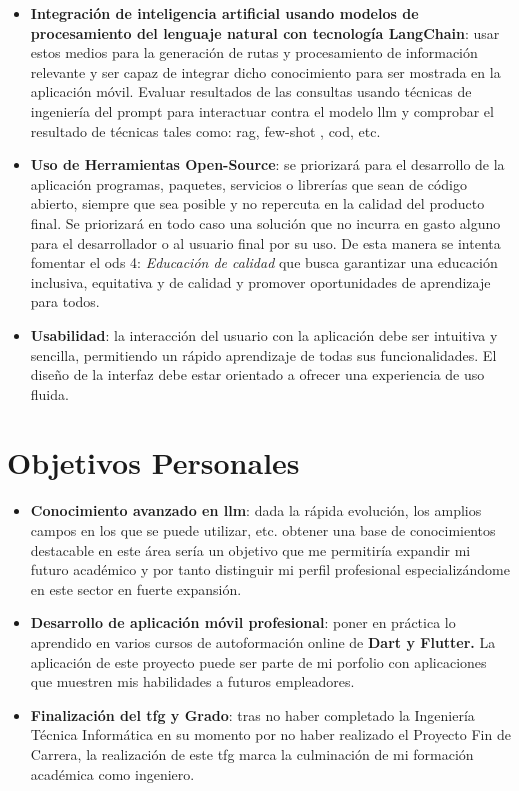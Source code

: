 \begin{itemize}
    \item \textbf{Integración de inteligencia artificial usando modelos de procesamiento del lenguaje natural con tecnología LangChain}: usar estos medios para la generación de rutas y procesamiento de información relevante y ser capaz de integrar dicho conocimiento para ser mostrada en la aplicación móvil. Evaluar resultados de las consultas usando técnicas de ingeniería del prompt para interactuar contra el modelo \acrshort{llm} y comprobar el resultado de técnicas tales como: \acrfull{rag}, few-shot , \acrfull{cod}, etc. 
    \item \textbf{Uso de Herramientas Open-Source}: se priorizará para el desarrollo de la aplicación programas, paquetes, servicios o librerías que sean de código abierto, siempre que sea posible y no repercuta en la calidad del producto final. Se priorizará en todo caso una solución que no incurra en gasto alguno para el desarrollador o al usuario final por su uso. De esta manera se intenta fomentar el \acrshort{ods} 4: \textit{Educación de calidad} que busca garantizar una educación inclusiva, equitativa y de calidad y promover oportunidades de aprendizaje para todos.
    \item \textbf{Usabilidad}: la interacción del usuario con la aplicación debe ser intuitiva y sencilla, permitiendo un rápido aprendizaje de todas sus funcionalidades. El diseño de la interfaz debe estar orientado a ofrecer una experiencia de uso fluida.
\end{itemize}

\section{Objetivos Personales}

\begin{itemize}
	\item \textbf{Conocimiento avanzado en \acrshort{llm}}: dada la rápida evolución, los amplios campos en los que se puede utilizar, etc. obtener una base de conocimientos destacable en este área sería un objetivo que me permitiría expandir mi futuro académico y por tanto distinguir mi perfil profesional especializándome en este sector en fuerte expansión.
	\item \textbf{Desarrollo de aplicación móvil profesional}: poner en práctica lo aprendido en varios cursos de autoformación online de \textbf{Dart y Flutter.} La aplicación de este proyecto puede ser parte de mi porfolio con aplicaciones que muestren mis habilidades a futuros empleadores.
	\item \textbf{Finalización del \acrshort{tfg} y Grado}: tras no haber completado la Ingeniería Técnica Informática en su momento por no haber realizado el Proyecto Fin de Carrera, la realización de este \acrshort{tfg} marca la culminación de mi formación académica como ingeniero.
\end{itemize}

